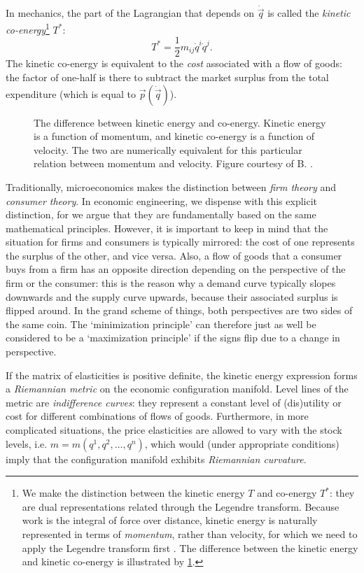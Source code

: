 In mechanics, the part of the Lagrangian that depends on \(\dot{\vec{q}}\) is called the \emph{kinetic co-energy}\footnote{We make the distinction between the kinetic energy \(T\) and co-energy \(T^*\): they are dual representations related through the Legendre transform. Because work is the integral of force over distance, kinetic energy is naturally represented in terms of \emph{momentum}, rather than velocity, for which we need to apply the Legendre transform first \cite{Jeltsema2009}. The difference between the kinetic energy and kinetic co-energy is illustrated by \cref{fig:kinetic_energy}.} \(T^*\):
\begin{equation}
    T^* = \frac{1}{2}m_{ij}\dot{q}^i \dot{q}^j.
\end{equation} 
The kinetic co-energy is equivalent to the \emph{cost} associated with a flow of goods: the factor of one-half is there to subtract the market surplus from the total expenditure (which is equal to \(\vec{p}(\dot{\vec{q}})\)).

\begin{figure}
    \centering
    
    \caption{The difference between kinetic energy and co-energy. Kinetic energy is a function of momentum, and kinetic co-energy is a function of velocity. The two are numerically equivalent for this particular relation between momentum and velocity. Figure courtesy of B. \citet{Krabbenborg2021}.}
    \label{fig:kinetic_energy}
\end{figure}

Traditionally, microeconomics makes the distinction between \emph{firm theory} and \emph{consumer theory}. In economic engineering, we dispense with this explicit distinction, for we argue that they are fundamentally based on the same mathematical principles. However, it is important to keep in mind that the situation for firms and consumers is typically mirrored: the cost of one represents the surplus of the other, and vice versa. Also, a flow of goods that a consumer buys from a firm has an opposite direction depending on the perspective of the firm or the consumer: this is the reason why a demand curve typically slopes downwards and the supply curve upwards, because their associated surplus is flipped around. In the grand scheme of things, both perspectives are two sides of the same coin. The `minimization principle' can therefore just as well be considered to be a `maximization principle' if the signs flip due to a change in perspective.

If the matrix of elasticities is positive definite, the kinetic energy expression forms a \emph{Riemannian metric} on the economic configuration manifold. Level lines of the metric are \emph{indifference curves}: they represent a constant level of (dis)utility or cost for different combinations of flows of goods. Furthermore, in more complicated situations, the price elasticities are allowed to vary with the stock levels, i.e. \( m = m(q^1, q^2, \ldots, q^n)\), which would (under appropriate conditions) imply that the configuration manifold exhibits \emph{Riemannian curvature}.

